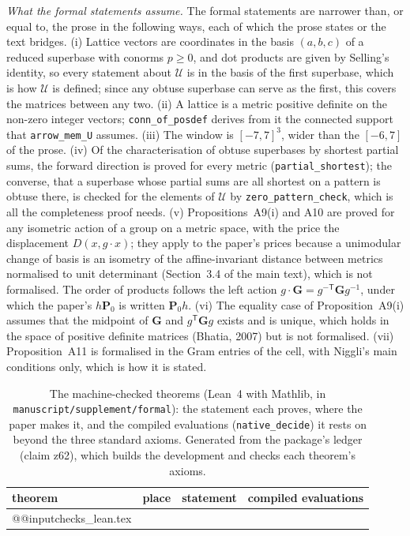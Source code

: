 \documentclass[preprint,pdf]{iucr}          %
\newcommand{\Gmet}{\mathbf{G}}
\newcommand{\Pop}{\mathbf{P}}
\newcommand{\dist}{D}
\begin{document}
\emph{What the formal statements assume.} The formal statements are narrower than, or equal to, the prose in the following ways, each of which the prose states or the text bridges. (i) Lattice vectors are coordinates in the basis $(a,b,c)$ of a reduced superbase with conorms $p\ge0$, and dot products are given by Selling's identity, so every statement about $\mathcal U$ is in the basis of the first superbase, which is how $\mathcal U$ is defined; since any obtuse superbase can serve as the first, this covers the matrices between any two. (ii) A lattice is a metric positive definite on the non-zero integer vectors; \texttt{conn\_\allowbreak of\_\allowbreak posdef} derives from it the connected support that \texttt{arrow\_\allowbreak mem\_U} assumes. (iii) The window is $[-7,7]^3$, wider than the $[-6,7]$ of the prose. (iv) Of the characterisation of obtuse superbases by shortest partial sums, the forward direction is proved for every metric (\texttt{partial\_\allowbreak shortest}); the converse, that a superbase whose partial sums are all shortest on a pattern is obtuse there, is checked for the elements of $\mathcal U$ by \texttt{zero\_\allowbreak pattern\_\allowbreak check}, which is all the completeness proof needs. (v) Propositions~A9(i) and A10 are proved for any isometric action of a group on a metric space, with the price the displacement $\dist(x,g\cdot x)$; they apply to the paper's prices because a unimodular change of basis is an isometry of the affine-invariant distance between metrics normalised to unit determinant (Section~3.4 of the main text), which is not formalised. The order of products follows the left action $g\cdot\Gmet=g^{-\mathsf T}\Gmet g^{-1}$, under which the paper's $h\Pop_0$ is written $\Pop_0h$. (vi) The equality case of Proposition~A9(i) assumes that the midpoint of $\Gmet$ and $g^{\mathsf T}\Gmet g$ exists and is unique, which holds in the space of positive definite matrices (Bhatia, 2007) but is not formalised. (vii) Proposition~A11 is formalised in the Gram entries of the cell, with Niggli's main conditions only, which is how it is stated.

\begin{table}
\caption{The machine-checked theorems (Lean~4 with Mathlib, in \texttt{manuscript/\allowbreak supplement/\allowbreak formal}): the statement each proves, where the paper makes it, and the compiled evaluations (\texttt{native\_decide}) it rests on beyond the three standard axioms. Generated from the package's ledger (claim z62), which builds the development and checks each theorem's axioms.}
\label{tab:lean}
\begin{scriptsize}
\begin{tabular}{>{\raggedright\arraybackslash}p{3.2cm}>{\raggedright\arraybackslash}p{2.2cm}>{\raggedright\arraybackslash}p{6.4cm}>{\raggedright\arraybackslash}p{2.8cm}}
\toprule
theorem & place & statement & compiled evaluations \\
\midrule
\csname @@input\endcsname checks_lean.tex 
\bottomrule
\end{tabular}
\end{scriptsize}
\end{table}
\end{document}
